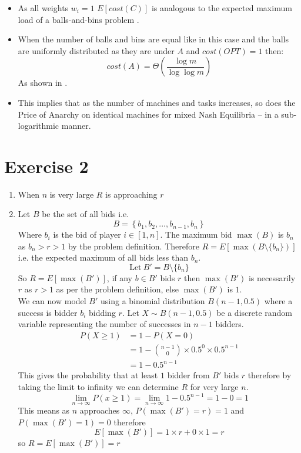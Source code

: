 \documentclass[]{article}
\begin{document}
\begin{enumerate}
\begin{itemize}
		\item
		As all weights $w_i=1$ $E[cost(C)]$ is analogous to the expected maximum load of a balls-and-bins problem .
		\item
		When the number of balls and bins are equal like in this case and the balls are uniformly distributed as they are under $A$ and $cost(OPT)=1$ then:
		\[
			cost(A)=\Theta\left(\frac{\log m}{\log\log m}\right)
		\]
		As shown in \cite{b1}.
		\item
		This implies that as the number of machines and tasks increases, so does the Price of Anarchy on identical machines for mixed Nash Equilibria -- in a sub-logarithmic manner.
	\end{itemize}
\end{enumerate}

\section*{Exercise 2}
\begin{enumerate}
	\item When $n$ is very large $R$ is approaching $r$
	\item
	Let $B$ be the set of all bids i.e. 
	\[B=\left\{b_1,b_2,...,b_{n-1},b_n \right\}\]
	Where $b_i$ is the bid of player $i \in [1,n]$.
	The maximum bid $\max(B)$ is $b_n$ as $b_n > r > 1$ by the problem definition.
	Therefore $R=E[\max(B\setminus\{b_n\})]$ i.e. the expected maximum of all bids less than $b_n$.
	\[
	\text{Let}\ B'=B\setminus\{b_n\}
	\]
	So $R=E[\max(B')]$, if any $b\in B'$ bids $r$ then $\max(B')$ is necessarily $r$ as $r>1$ as per the problem definition, else $\max(B')$ is $1$.\\
	We can now model $B'$ using a binomial distribution $B(n-1, 0.5)$ where a success is bidder $b_i$ bidding $r$. Let $X\sim B(n-1,0.5)$ be a discrete random variable representing the number of successes in $n-1$ bidders.
	\begin{align*}
		P(X\geq 1) &= 1-P(X=0) \\
		&= 1-\binom{n-1}{0}\times0.5^0\times0.5^{n-1} \\
		&= 1-0.5^{n-1}
	\end{align*}
This gives the probability that at least $1$ bidder from $B'$ bids $r$ therefore by taking the limit to infinity we can determine $R$ for very large $n$.
\[
\lim_{n \to \infty}  P(x\geq 1) = \lim_{n \to \infty} 1-0.5^{n-1} = 1-0 = 1
\]
This means as $n$ approaches $\infty$, $P(\max(B')=r)=1$ and $P(\max(B')=1)=0$ therefore
\[
	E[\max(B')]=1\times r + 0 \times 1 = r
\]
so $R=E[\max(B')] = r$
\end{enumerate}
\end{document}
